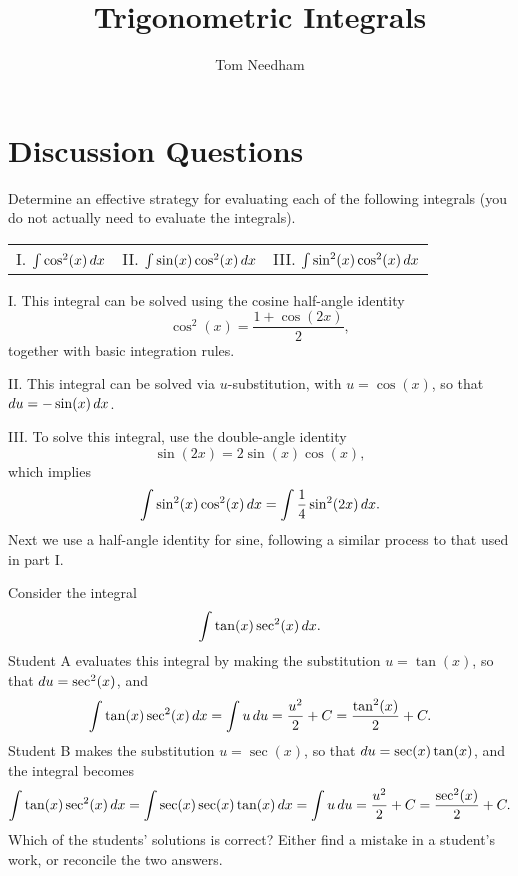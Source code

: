 \documentclass[]{ximera}
\author{Tom Needham}
\title[]{Trigonometric Integrals}
\begin{document}
\begin{abstract}
\end{abstract}
\maketitle


\section{Discussion Questions}

\begin{problem}
Determine an effective strategy for evaluating each of the following integrals (you do not actually need to evaluate the integrals).

\begin{center}
\begin{tabular}{lll}
I. $\int \cos^2(x) \mathop{}\!d x$ \hspace{.1in} & II. $\int \sin (x) \cos^2(x) \mathop{}\!d x$ \hspace{.1in} &  III. $\int \sin^2(x) \cos^2(x) \mathop{}\!d x$
\end{tabular}
\end{center}
\end{problem}

\begin{freeResponse}
I. This integral can be solved using the cosine half-angle identity 
$$
\cos^2(x) = \frac{1+\cos(2x)}{2},
$$
together with basic integration rules.

II. This integral can be solved via $u$-substitution, with $u=\cos (x)$, so that $\mathop{}\!d u = -\sin (x) \mathop{}\!d x$.

III. To solve this integral, use the double-angle identity
$$
\sin (2x) = 2 \sin(x) \cos(x),
$$
which implies
$$
\int \sin^2(x) \cos^2(x) \mathop{}\!d x= \int \frac{1}{4} \sin^2(2x) \mathop{}\!d x.
$$
Next we use a half-angle identity for sine, following a similar process to that used in part I.
\end{freeResponse}

\begin{problem}
Consider the integral
$$
\int \tan (x) \sec^2(x) \mathop{}\!d x.
$$
Student A evaluates this integral by making the substitution $u=\tan(x)$, so that $\mathop{}\!d u = \sec^2 (x)$, and
$$
\int \tan(x) \sec^2(x) \mathop{}\!d x = \int u \mathop{}\!d u = \frac{u^2}{2} + C = \frac{\tan^2 (x)}{2} + C.
$$
Student B makes the substitution $u = \sec(x)$, so that $\mathop{}\!d u = \sec(x) \tan(x)$, and the integral becomes
$$
\int \tan (x) \sec^2 (x) \mathop{}\!d x = \int \sec(x) \sec (x) \tan (x) \mathop{}\!d x = \int u \mathop{}\!d u = \frac{u^2}{2} +C = \frac{\sec^2(x)}{2} +C.
$$
Which of the students' solutions is correct? Either find a mistake in a student's work, or reconcile the two answers.
\end{problem}
\end{document}
